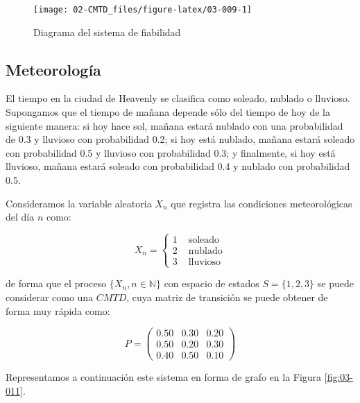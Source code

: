 \documentclass[
]{book}
\theoremstyle{definition}
\theoremstyle{definition}
\theoremstyle{definition}
\theoremstyle{definition}
\theoremstyle{remark}
\begin{document}
\begin{figure}

{\centering \texttt{[image: 02-CMTD\_files/figure-latex/03-009-1]} 

}

\caption{Diagrama del sistema de fiabilidad}\label{fig:03-009}
\end{figure}

\hypertarget{meteo}{%
\subsection{Meteorología}\label{meteo}}

El tiempo en la ciudad de Heavenly se clasifica como soleado, nublado o lluvioso. Supongamos que el tiempo de mañana depende sólo del tiempo de hoy de la siguiente manera: si hoy hace sol, mañana estará nublado con una probabilidad de 0.3 y lluvioso con probabilidad 0.2; si hoy está nublado, mañana estará soleado con probabilidad 0.5 y lluvioso con probabilidad 0.3; y finalmente, si hoy está lluvioso, mañana estará soleado con probabilidad 0.4 y nublado con probabilidad 0.5.

Consideramos la variable aleatoria \(X_n\) que registra las condiciones meteorológicas del día \(n\) como:

\begin{equation*}
X_{n} = 
\begin{cases}
1 & \text{ soleado}\\
2 & \text{ nublado}\\
3 & \text{ lluvioso}
\end{cases}
\end{equation*}

de forma que el proceso \(\{X_n, n \in \mathbb{N}\}\) con espacio de estados \(S = \{1, 2, 3\}\) se puede considerar como una \(CMTD\), cuya matriz de transición se puede obtener de forma muy rápida como:

\[P = 
\begin{pmatrix}
0.50 & 0.30 & 0.20\\
0.50 & 0.20 & 0.30\\
0.40 & 0.50 & 0.10
\end{pmatrix}\]

Representamos a continuación este sistema en forma de grafo en la Figura \ref{fig:03-011}.
\end{document}
